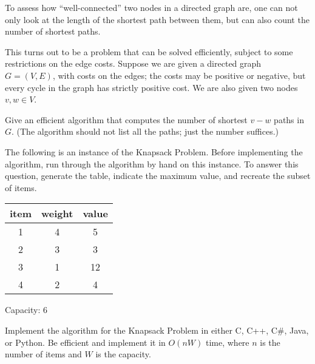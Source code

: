 \documentclass[solutionbox,answers]{exam}
\begin{document}
\begin{questions}
To assess how “well-connected” two nodes in a directed graph are, one can not only look at the length of the shortest path between them, but can also count the number of shortest paths. 

This turns out to be a problem that can be solved efficiently, subject to some restrictions on the edge costs. Suppose we are given a directed graph $G = (V, E)$, with costs on the edges; the costs may be positive or negative, but every cycle in the graph has strictly positive cost. We are also given two nodes $v, w\in V$. 

Give an efficient algorithm that computes the number of shortest $v-w$ paths in $G$. (The algorithm should not list all the paths; just the number suffices.) 

  \begin{solutionbox}{} \vspace{1em} 

  \end{solutionbox}

\newpage


\question The following is an instance of the Knapsack Problem. 
Before implementing the algorithm, run through the algorithm by hand on this instance. 
To answer this question, generate the table, indicate the maximum value, and recreate the subset of items.

\begin{center}
\begin{tabular}{ |c|c|c| } 
 \hline
 item & weight & value \\ 
\hline
\hline
 1 & 4 & 5 \\ 
\hline
 2 & 3 & 3 \\ 
\hline
 3 & 1 & 12 \\ 
\hline
 4 & 2 & 4 \\ 
 \hline
\end{tabular}

Capacity: 6
\end{center}
  \begin{solutionbox}{} \vspace{1em} 

  
  \end{solutionbox}


\question Implement the algorithm for the Knapsack Problem in either C, C++, C\#, Java, or Python. Be efficient and implement it in $O(nW)$ time, where $n$ is the number of items and $W$ is the capacity.


\end{questions}
\end{document}
